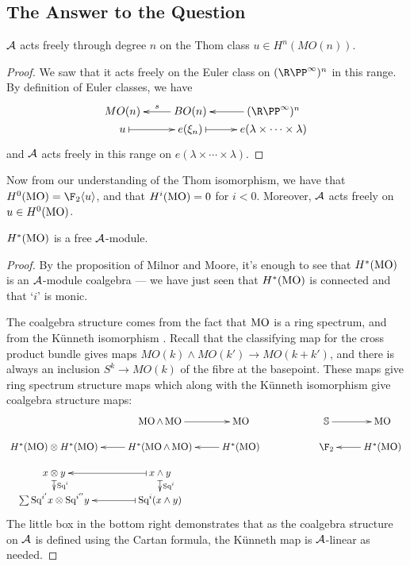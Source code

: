 \documentclass[11pt]{article}
\renewcommand{\Steen}{\calA}
\begin{document}
\subsection{The Answer to the Question}
\begin{thm*}
$\Steen$ acts freely through degree $n$ on the Thom class $u\in H^n(MO(n))$.
\end{thm*}
\begin{proof}
We saw that it acts freely on the Euler class on $(\RP^\infty)^n$ in this range. By definition of Euler classes, we have
\[\xymatrix@R=0mm{
MO(n)
&%
BO(n)
\ar[l]_-{s}
&%
(\RP^\infty)^n
\ar[l]
\\%
u
\ar@{|->}[r]
&%
e(\xi_n)
\ar@{|->}[r]
&%
e(\lambda\times \cdots \times \lambda)
}\] and $\Steen$ acts freely in this range on $e(\lambda\times \cdots \times \lambda)$.
\end{proof}
\noindent  Now from our understanding of the Thom isomorphism, we have that $H^0(\MO)=\F_2\langle u\rangle$, and that $H^{i}(\operatorname{{MO}})=0$ for $i<0$. Moreover, $\Steen$ acts freely on $u\in H^0(\operatorname{{MO}})$.
\begin{thm*}
$H^*(\operatorname{{MO}})$ is a free $\Steen$-module.
\end{thm*}
\begin{proof}
By the proposition of Milnor and Moore, it's enough to see that $H^*(\operatorname{{MO}})$ is an $\Steen$-module coalgebra --- we have just seen that $H^*(\operatorname{{MO}})$ is connected and that `$i$' is monic.

The coalgebra structure comes from the fact that $\operatorname{{MO}}$ is a ring spectrum, and from the K\"unneth isomorphism . Recall that the classifying map for the cross product bundle gives maps $MO(k)\wedge MO(k')\to MO(k+k')$, and there is always an inclusion $S^k\to MO(k)$ of the fibre at the basepoint. These maps give ring spectrum structure maps which along with the K\"unneth isomorphism give coalgebra structure maps:
\[\xymatrix@R=.4cm{
&%
\MO\wedge \MO
\ar[r]
&%
\MO&%
&
\mathbb{S}
\ar[r]
&%
\MO\\%
H^*(\MO)\otimes H^*(\MO)
&%
H^*(\MO\wedge \MO)
\ar[l]
&%
H^*(\MO)
\ar[l]
&%
&%
\F_2&%
H^*(\MO)
\ar[l]
\\
x\otimes y
\ar@{|->}[d]^-{\Squ^i}
&
x\wedge y\ar@{|->}[l]
\ar@{|->}[d]^-{\Squ^i}
\\
\sum \Squ^{i'}x\otimes \Squ^{i''}y&
\Squ^i(x\wedge y)\ar@{|->}[l]
}\]
The little box in the bottom right demonstrates that as the coalgebra structure on $\Steen$ is defined using the Cartan formula, the K\"unneth map is $\Steen$-linear as needed.
\end{proof}
\end{document}
